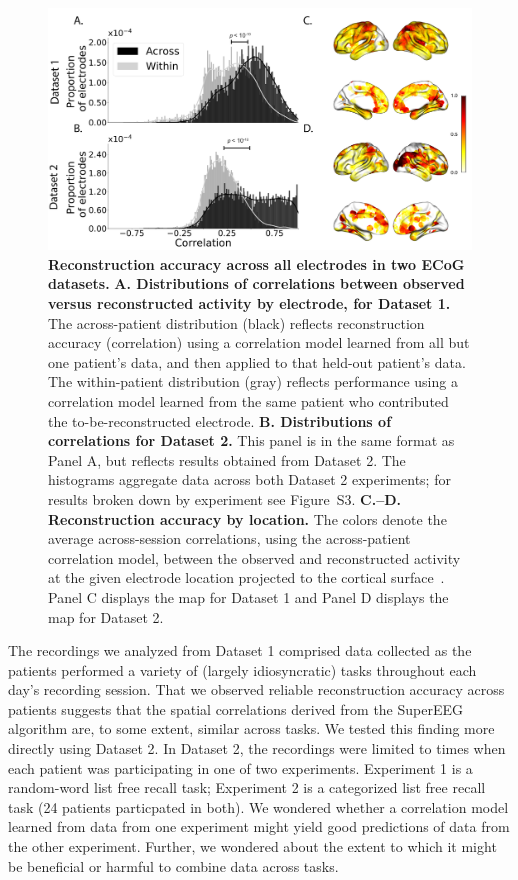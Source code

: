 \documentclass[11pt]{article}
\newcommand{\perexptaskreconseparated}{S3}
\begin{document}
\begin{figure}
  \centering \includegraphics[width=\textwidth]{figs/corrmap}
  \caption{\textbf{Reconstruction accuracy across all electrodes in two ECoG
  datasets.}  \textbf{A. Distributions of correlations between observed versus
  reconstructed activity by electrode, for Dataset 1.}  The across-patient
  distribution (black) reflects reconstruction accuracy (correlation) using a
  correlation model learned from all but one patient's data, and then applied to
  that held-out patient's data.  The within-patient distribution (gray) reflects
  performance using a correlation model learned from the same patient who
  contributed the to-be-reconstructed electrode. \textbf{B. Distributions of
  correlations for Dataset 2.}  This panel is in the same format as Panel A, but
  reflects results obtained from Dataset 2.  The histograms aggregate data
  across both Dataset 2 experiments; for results broken down by experiment see
  Figure~\perexptaskreconseparated. \textbf{C.--D.  Reconstruction accuracy by
  location.} The colors denote the average across-session correlations, using
  the across-patient correlation model, between the observed and reconstructed
  activity at the given electrode location projected to the cortical
  surface~\citep{CombEtal19}.  Panel C displays the map for Dataset 1 and Panel
  D displays the map for Dataset 2.} \label{fig:corrmap}
\end{figure}

The recordings we analyzed from Dataset 1 comprised data collected as the
patients performed a variety of (largely idiosyncratic) tasks throughout each
day's recording session.  That we observed reliable reconstruction accuracy
across patients suggests that the spatial correlations derived from the SuperEEG
algorithm are, to some extent, similar across tasks.  We tested this finding
more directly using Dataset 2.  In Dataset 2, the recordings were limited to
times when each patient was participating in one of two experiments.  Experiment
1 is a random-word list free recall task; Experiment 2 is a categorized list
free recall task (24 patients particpated in both).  We wondered whether a
correlation model learned from data from one experiment might yield good
predictions of data from the other experiment.  Further, we wondered about the
extent to which it might be beneficial or harmful to combine data across tasks.
\end{document}
